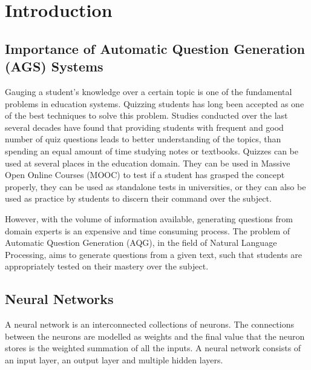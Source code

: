 %

\chapter{Introduction}

\section{Importance of Automatic Question Generation (AGS) Systems}

Gauging a student’s knowledge over a certain topic is one of the fundamental
problems in education systems. Quizzing students has long been accepted as one
of the best techniques to solve this problem. Studies conducted over the last
several decades have found that providing students with frequent and good number
of quiz questions leads to better understanding of the topics, than spending an
equal amount of time studying notes or textbooks. Quizzes can be used at several
places in the education domain. They can be used in Massive Open Online Courses (MOOC) to test if a student
has  grasped the concept properly, they can be used as standalone tests in
universities, or they can also be used as practice by students to discern their
command over the subject. 

However, with the volume of information available, generating questions from
domain experts is an expensive and time consuming process. The problem of Automatic
Question Generation (AQG), in the field of Natural Language Processing, aims to
generate questions from a given text, such that students are appropriately
tested on their mastery over the subject.

\section{Neural Networks}

A neural network is an interconnected collections of neurons. The connections
between the neurons are modelled as weights and the final value that the neuron
stores is the weighted summation of all the inputs. A neural network consists of
an input layer, an output layer and multiple hidden layers.

